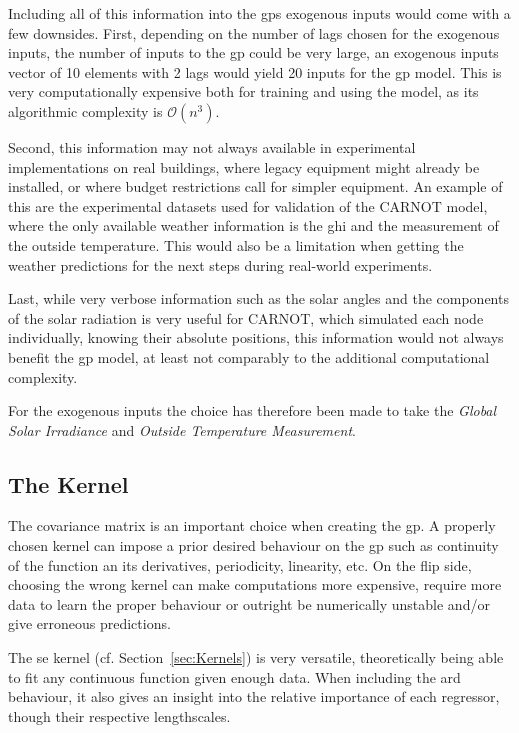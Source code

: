 Including all of this information into the \acrshort{gp}s exogenous inputs would
come with a few downsides. First, depending on the number of lags chosen for the
exogenous inputs, the number of inputs to the \acrshort{gp} could be very large,
an exogenous inputs vector of 10 elements with 2 lags would yield 20 inputs for
the \acrshort{gp} model. This is very computationally expensive both for
training and using the model, as its algorithmic complexity is
$\mathcal{O}(n^3)$.

Second, this information may not always available in experimental
implementations on real buildings, where legacy equipment might already be
installed, or where budget restrictions call for simpler equipment.  An example
of this are the experimental datasets used for validation of the CARNOT model,
where the only available weather information is the \acrshort{ghi} and the
measurement of the outside temperature. This would also be a limitation when
getting the weather predictions for the next steps during real-world
experiments.

Last, while very verbose information such as the solar angles and the components
of the solar radiation is very useful for CARNOT, which simulated each node
individually, knowing their absolute positions, this information would not
always benefit the \acrshort{gp} model, at least not comparably to the
additional computational complexity.

For the exogenous inputs the choice has therefore been made to take the
\textit{Global Solar Irradiance} and \textit{Outside Temperature Measurement}.

\subsection{The Kernel}

The covariance matrix is an important choice when creating the \acrshort{gp}. A
properly chosen kernel can impose a prior desired behaviour on the
\acrshort{gp} such as continuity of the function an its derivatives,
periodicity, linearity, etc. On the flip side, choosing the wrong kernel can
make computations more expensive, require more data to learn the proper
behaviour or outright be numerically unstable and/or give erroneous predictions.

The \acrlong{se} kernel (cf. Section~\ref{sec:Kernels}) is very versatile,
theoretically being able to fit any continuous function given enough data. When
including the \acrshort{ard} behaviour, it also gives an insight into the
relative importance of each regressor, though their respective lengthscales.

